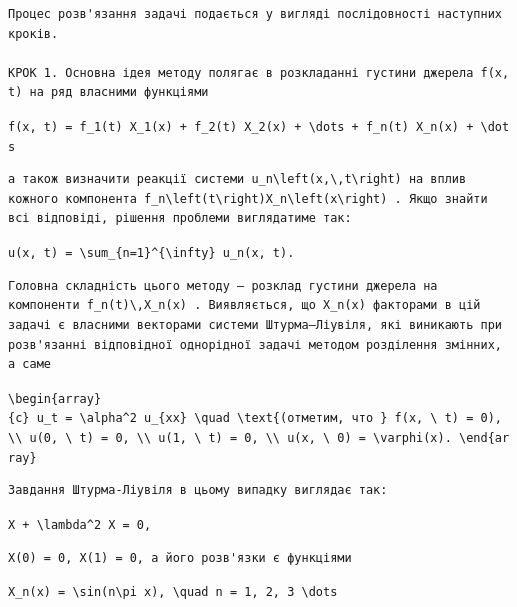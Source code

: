 \documentclass[
  ukrainian,
]{article}
\begin{document}
\begin{verbatim}
Процес розв'язання задачі подається у вигляді послідовності наступних кроків.

КРОК 1. Основна ідея методу полягає в розкладанні густини джерела f(x, t) на ряд власними функціями
\end{verbatim}

\texttt{f(x,\ t)\ =\ f\_1(t)\ X\_1(x)\ +\ f\_2(t)\ X\_2(x)\ +\ \textbackslash{}dots\ +\ f\_n(t)\ X\_n(x)\ +\ \textbackslash{}dots}

\begin{verbatim}
а також визначити реакції системи u_n\left(x,\,t\right) на вплив кожного компонента f_n\left(t\right)X_n\left(x\right) . Якщо знайти всі відповіді, рішення проблеми виглядатиме так:
\end{verbatim}

\texttt{u(x,\ t)\ =\ \textbackslash{}sum\_\{n=1\}\^{}\{\textbackslash{}infty\}\ u\_n(x,\ t).}

\begin{verbatim}
Головна складність цього методу — розклад густини джерела на компоненти f_n(t)\,X_n(x) . Виявляється, що X_n(x) факторами в цій задачі є власними векторами системи Штурма–Ліувіля, які виникають при розв'язанні відповідної однорідної задачі методом розділення змінних, а саме
\end{verbatim}

\texttt{\textbackslash{}begin\{array\}\{c\}\ u\_t\ =\ \textbackslash{}alpha\^{}2\ u\_\{xx\}\ \textbackslash{}quad\ \textbackslash{}text\{(отметим,\ что\ \}\ f(x,\ \textbackslash{}\ t)\ =\ 0),\ \textbackslash{}\textbackslash{}\ u(0,\ \textbackslash{}\ t)\ =\ 0,\ \textbackslash{}\textbackslash{}\ u(1,\ \textbackslash{}\ t)\ =\ 0,\ \textbackslash{}\textbackslash{}\ u(x,\ \textbackslash{}\ 0)\ =\ \textbackslash{}varphi(x).\ \textbackslash{}end\{array\}}

\begin{verbatim}
Завдання Штурма-Ліувіля в цьому випадку виглядає так:
\end{verbatim}

\texttt{X\textquotesingle{}\textquotesingle{}\ +\ \textbackslash{}lambda\^{}2\ X\ =\ 0,}

\begin{verbatim}
X(0) = 0, X(1) = 0, а його розв'язки є функціями
\end{verbatim}

\texttt{X\_n(x)\ =\ \textbackslash{}sin(n\textbackslash{}pi\ x),\ \textbackslash{}quad\ n\ =\ 1,\ 2,\ 3\ \textbackslash{}dots}
\end{document}
